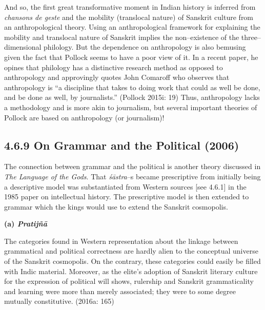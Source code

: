And so, the first great transformative moment in Indian history is inferred from\textit{ chansons de geste} and the mobility (translocal nature) of Sanskrit culture from an anthropological theory. Using an anthropological framework for explaining the mobility and translocal nature of Sanskrit implies the non–existence of the three–dimensional philology. But the dependence on anthropology is also bemusing given the fact that Pollock seems to have a poor view of it. In a recent paper, he opines that philology has a distinctive research method as opposed to anthropology and approvingly quotes John Comaroff who observes that anthropology is “a discipline that takes to doing work that could as well be done, and be done as well, by journalists.” (Pollock 2015i: 19) Thus, anthropology lacks a methodology and is more akin to journalism, but several important theories of Pollock are based on anthropology (or journalism)!


\vspace{-.3cm}

\subsection*{4.6.9 On Grammar and the Political (2006)}

\vspace{-.2cm}

The connection between grammar and the political is another theory discussed in \textit{The Language of the Gods}. That \textit{śāstra}–s became prescriptive from initially being a descriptive model was substantiated from Western sources [see 4.6.1] in the 1985 paper on intellectual history. The prescriptive model is then extended to grammar which the kings would use to extend the Sanskrit cosmopolis.

\textbf{(a) \textit{Pratijñā }}

\begin{myquote}
The categories found in Western representation about the linkage between grammatical and political correctness are hardly alien to the conceptual universe of the Sanskrit cosmopolis. On the contrary, these categories could easily be ﬁlled with Indic material. Moreover, as the elite’s adoption of Sanskrit literary culture for the expression of political will shows, rulership and Sanskrit grammaticality and learning were more than merely associated; they were to some degree mutually constitutive. (2016a: 165)
\end{myquote}

